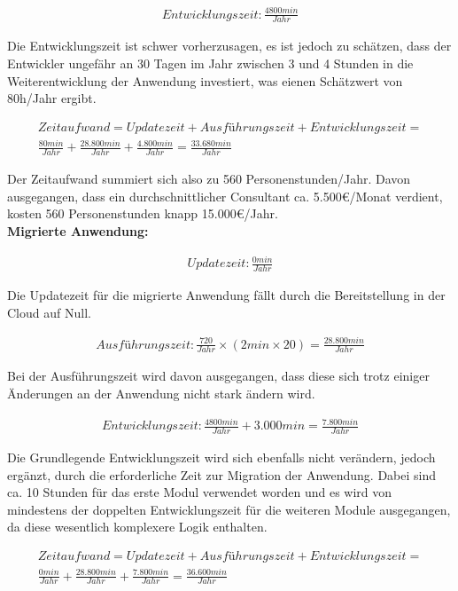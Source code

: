\begin{align}
    Entwicklungszeit: \frac{4800min}{Jahr}
\end{align}

Die Entwicklungszeit ist schwer vorherzusagen, es ist jedoch zu schätzen, dass der Entwickler ungefähr an 30 Tagen im Jahr zwischen 3 und 4 Stunden in die Weiterentwicklung der Anwendung investiert, was eienen Schätzwert von 80h/Jahr ergibt.

\begin{align}
    Zeitaufwand = Updatezeit + Ausführungszeit + Entwicklungszeit = \\
    \frac{80min}{Jahr} + \frac{28.800min}{Jahr} + \frac{4.800min}{Jahr} = \frac{33.680min}{Jahr}
\end{align}

Der Zeitaufwand summiert sich also zu 560 Personenstunden/Jahr. Davon ausgegangen, dass ein durchschnittlicher Consultant ca. 5.500€/Monat verdient, kosten 560 Personenstunden knapp 15.000€/Jahr. \\

\textbf{Migrierte Anwendung:}

\begin{align}
    Updatezeit: \frac{0min}{Jahr}
\end{align}

Die Updatezeit für die migrierte Anwendung fällt durch die Bereitstellung in der Cloud auf Null.

\begin{align}
    Ausführungszeit: \frac{720}{Jahr} \times \left(2min \times 20\right)  = \frac{28.800min}{Jahr}
\end{align}

Bei der Ausführungszeit wird davon ausgegangen, dass diese sich trotz einiger Änderungen an der Anwendung nicht stark ändern wird.

\begin{align}
    Entwicklungszeit: \frac{4800min}{Jahr} + 3.000min = \frac{7.800min}{Jahr}
\end{align}

Die Grundlegende Entwicklungszeit wird sich ebenfalls nicht verändern, jedoch ergänzt, durch die erforderliche Zeit zur Migration der Anwendung. Dabei sind ca. 10 Stunden für das erste Modul verwendet worden und es wird von mindestens der doppelten Entwicklungszeit für die weiteren Module ausgegangen, da diese wesentlich komplexere Logik enthalten.

\begin{align}
    Zeitaufwand = Updatezeit + Ausführungszeit + Entwicklungszeit = \\
    \frac{0min}{Jahr} + \frac{28.800min}{Jahr} + \frac{7.800min}{Jahr} = \frac{36.600min}{Jahr}
\end{align}

